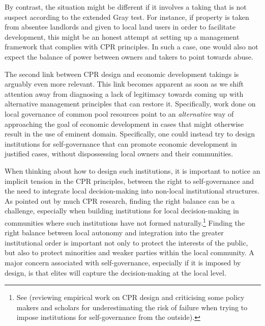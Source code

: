 By contrast, the situation might be different if it involves a taking that is not suspect according to the extended Gray test. For instance, if property is taken from absentee landlords and given to local land users in order to facilitate development, this might be an honest attempt at setting up a management framework that complies with CPR principles. In such a case, one would also not expect the balance of power between owners and takers to point towards abuse.

The second link between CPR design and economic development takings is arguably even more relevant. This link becomes apparent as soon as we shift attention away from diagnosing a lack of legitimacy towards coming up with alternative management principles that can restore it. Specifically, work done on local governance of common pool resources point to an {\it alternative} way of approaching the goal of economic development in cases that might otherwise result in the use of eminent domain. Specifically, one could instead try to design institutions for self-governance that can promote economic development in justified cases, without dispossessing local owners and their communities.

When thinking about how to design such institutions, it is important to notice an implicit tension in the CPR principles, between the right to self-governance and the need to integrate local decision-making into non-local institutional structures. As pointed out by much CPR research, finding the right balance can be a challenge, especially when building institutions for local decision-making in communities where such institutions have not formed naturally.\footnote{See \cite{saunders14} (reviewing empirical work on CPR design and criticising some policy makers and scholars for underestimating the risk of failure when trying to impose institutions for self-governance from the outside).} Finding the right balance between local autonomy and integration into the greater institutional order is important not only to protect the interests of the public, but also to protect minorities and weaker parties within the local community. A major concern associated with self-governance, especially if it is imposed by design, is that elites will capture the decision-making at the local level.

